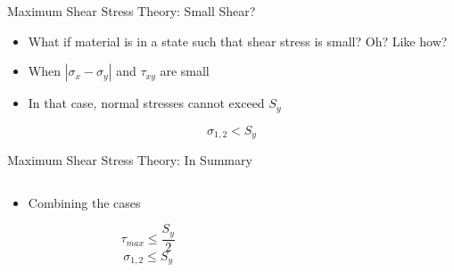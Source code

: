 \documentclass[10pt, svgnames]{beamer}
\begin{document}
\begin{frame}[label={sec:org2b81ba1}]{Maximum Shear Stress Theory: Small Shear?}
\begin{itemize}
\item What if material is in a state such that shear stress is small? Oh? Like how?
\item When \(|\sigma_x - \sigma_y|\) and \(\tau_{xy}\) are small
\item In that case, normal stresses cannot exceed \(S_y\)
\end{itemize}
$$\sigma_{1,2} < S_y $$
\end{frame}

\begin{frame}[label={sec:orgcf091c9}]{Maximum Shear Stress Theory: In Summary}
\begin{columns}
\begin{column}{0.4\columnwidth}
\begin{itemize}
\item Combining the cases
\end{itemize}
$$\tau_{max} \leqslant \frac{S_y}{2}$$
$$\sigma_{1,2} \leqslant S_y $$
\end{column}

\begin{column}{0.6\columnwidth}
\end{column}
\end{columns}
\end{frame}
\end{document}
